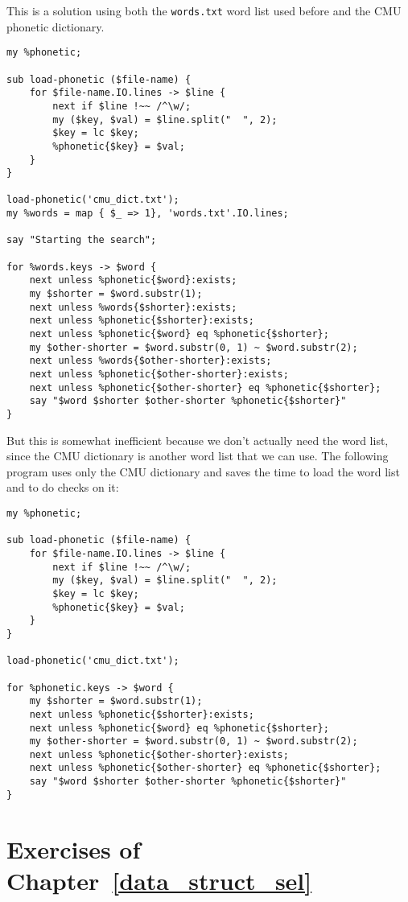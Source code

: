 {This is a solution using both the {\tt words.txt} word list 
used before and the CMU phonetic dictionary.

\begin{verbatim}
my %phonetic;

sub load-phonetic ($file-name) {
    for $file-name.IO.lines -> $line {
        next if $line !~~ /^\w/; 
        my ($key, $val) = $line.split("  ", 2);
        $key = lc $key;
        %phonetic{$key} = $val;
    }
}

load-phonetic('cmu_dict.txt');
my %words = map { $_ => 1}, 'words.txt'.IO.lines;

say "Starting the search";

for %words.keys -> $word {
    next unless %phonetic{$word}:exists;
    my $shorter = $word.substr(1);
    next unless %words{$shorter}:exists;
    next unless %phonetic{$shorter}:exists;
    next unless %phonetic{$word} eq %phonetic{$shorter};
    my $other-shorter = $word.substr(0, 1) ~ $word.substr(2);
    next unless %words{$other-shorter}:exists;
    next unless %phonetic{$other-shorter}:exists;
    next unless %phonetic{$other-shorter} eq %phonetic{$shorter};
    say "$word $shorter $other-shorter %phonetic{$shorter}"
}
\end{verbatim}

But this is somewhat inefficient because we don't actually 
need the word list, since the CMU dictionary is another 
word list that we can use. The following program uses 
only the CMU dictionary and saves the time to load the 
word list and to do checks on it:

\begin{verbatim}
my %phonetic;

sub load-phonetic ($file-name) {
    for $file-name.IO.lines -> $line {
        next if $line !~~ /^\w/; 
        my ($key, $val) = $line.split("  ", 2);
        $key = lc $key;
        %phonetic{$key} = $val;
    }
}

load-phonetic('cmu_dict.txt');

for %phonetic.keys -> $word {
    my $shorter = $word.substr(1);
    next unless %phonetic{$shorter}:exists;
    next unless %phonetic{$word} eq %phonetic{$shorter};
    my $other-shorter = $word.substr(0, 1) ~ $word.substr(2);
    next unless %phonetic{$other-shorter}:exists;
    next unless %phonetic{$other-shorter} eq %phonetic{$shorter};
    say "$word $shorter $other-shorter %phonetic{$shorter}"
}
\end{verbatim}

\section{Exercises of Chapter~\ref{data_struct_sel}}

}
